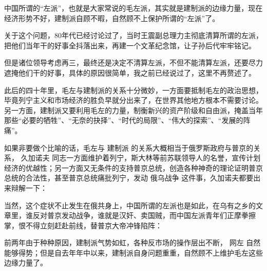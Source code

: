 \begin{zhihuanswer}
中国所谓的``左派''，也就是大家常说的毛左派，其实就是建制派的边缘力量，现在经济形势不好，建制派自顾不暇，自然顾不上保护所谓的``左派''了。

关于这个问题，80年代已经讨论过了，当时王震副总理力主彻底清算所谓的左派，把他们当年干的好事全抖落出来，再建一个文革纪念馆，让子孙后代牢牢铭记。

但是诸位领导考虑再三，最终还是决定不清算左派，不但不能清算左派，还要尽力遮掩他们干的好事，具体的原因很简单，我之前已经说过了，这里不再赘述了。

此后的四十年里，毛左与建制派的关系十分微妙，一方面要抵制毛左的政治思想，毕竟列宁主义和市场经济的胜负早就分出来了，在世界其他地方根本不需要讨论。另一方面，建制派又要利用毛左的力量，制衡新兴的资产阶级和自由派，掩盖当年那些``必要的牺牲''、``无奈的抉择''、``时代的局限''、``伟大的探索''、``发展的阵痛''。

如果非要做个比喻的话，毛左与 建制派
的关系大概相当于俄罗斯政府与普京的关系， 久加诺夫
同志一方面维护着列宁，斯大林等前苏联领导人的名誉，宣传计划经济的优越性；另一方面又无条件的支持普京总统，创造各种神奇的理论证明普京总统的合法性，甚至普京总统痛批列宁，发动
俄乌战争 这件事，久加诺夫都要出来辩解一下：

当然，这个症状不止发生在俄共身上，中国所谓的左派也是如此，在乌有之乡的文章里，谁反对普京发动战争，谁就是汉奸、卖国贼，而中国左派青年们正摩拳擦掌，恨不得立刻赶赴前线，替普京大帝冲锋陷阵：

前两年由于种种原因，建制派气势如虹，各种反市场的操作层出不断， 网左
自然能够得势；但是自去年年中以来，建制派自身问题重重，自然顾不上维护毛左这些边缘力量了。
\end{zhihuanswer}
